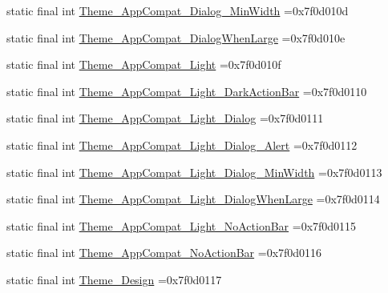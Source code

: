 \begin{DoxyCompactItemize}
\item 
static final int \mbox{\hyperlink{classcom_1_1example_1_1trainawearapplication_1_1_r_1_1style_a304b766824258ce8a05941c389ee28cf}{Theme\+\_\+\+App\+Compat\+\_\+\+Dialog\+\_\+\+Min\+Width}} =0x7f0d010d
\item 
static final int \mbox{\hyperlink{classcom_1_1example_1_1trainawearapplication_1_1_r_1_1style_a4c067ab6d84135a809052bad451c1204}{Theme\+\_\+\+App\+Compat\+\_\+\+Dialog\+When\+Large}} =0x7f0d010e
\item 
static final int \mbox{\hyperlink{classcom_1_1example_1_1trainawearapplication_1_1_r_1_1style_a15d9b8505594868045ef51560677063c}{Theme\+\_\+\+App\+Compat\+\_\+\+Light}} =0x7f0d010f
\item 
static final int \mbox{\hyperlink{classcom_1_1example_1_1trainawearapplication_1_1_r_1_1style_aff75dbd0509425bb436c683be15c6d3a}{Theme\+\_\+\+App\+Compat\+\_\+\+Light\+\_\+\+Dark\+Action\+Bar}} =0x7f0d0110
\item 
static final int \mbox{\hyperlink{classcom_1_1example_1_1trainawearapplication_1_1_r_1_1style_aa05b8addf47f82c545b95e8051e170d8}{Theme\+\_\+\+App\+Compat\+\_\+\+Light\+\_\+\+Dialog}} =0x7f0d0111
\item 
static final int \mbox{\hyperlink{classcom_1_1example_1_1trainawearapplication_1_1_r_1_1style_a0acff42680af2fa492443053086a9770}{Theme\+\_\+\+App\+Compat\+\_\+\+Light\+\_\+\+Dialog\+\_\+\+Alert}} =0x7f0d0112
\item 
static final int \mbox{\hyperlink{classcom_1_1example_1_1trainawearapplication_1_1_r_1_1style_ac5d13f92c93ce783287eceb790eb7981}{Theme\+\_\+\+App\+Compat\+\_\+\+Light\+\_\+\+Dialog\+\_\+\+Min\+Width}} =0x7f0d0113
\item 
static final int \mbox{\hyperlink{classcom_1_1example_1_1trainawearapplication_1_1_r_1_1style_a34ad2caf6da23bf085d15c582dcb471e}{Theme\+\_\+\+App\+Compat\+\_\+\+Light\+\_\+\+Dialog\+When\+Large}} =0x7f0d0114
\item 
static final int \mbox{\hyperlink{classcom_1_1example_1_1trainawearapplication_1_1_r_1_1style_ab1a02b794a17e8ce5898df9a48afe441}{Theme\+\_\+\+App\+Compat\+\_\+\+Light\+\_\+\+No\+Action\+Bar}} =0x7f0d0115
\item 
static final int \mbox{\hyperlink{classcom_1_1example_1_1trainawearapplication_1_1_r_1_1style_a25aabf5d52b6502013b0254dfd526614}{Theme\+\_\+\+App\+Compat\+\_\+\+No\+Action\+Bar}} =0x7f0d0116
\item 
static final int \mbox{\hyperlink{classcom_1_1example_1_1trainawearapplication_1_1_r_1_1style_aa5bc41dca9d1e312b1597bd80d4bbcd8}{Theme\+\_\+\+Design}} =0x7f0d0117

\end{DoxyCompactItemize}
